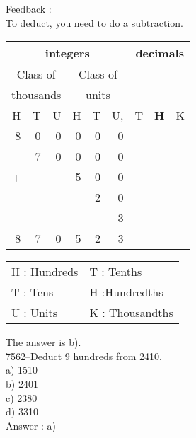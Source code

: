 \documentclass[letterpaper, 12pt]{article}
\begin{document}
Feedback :\\
To deduct, you need to do a subtraction.
\begin{center}
\begin{tabular}{|rrr|rrr|rrr|}
\hline
\multicolumn{6}{|c|}{integers} &\multicolumn{3}{|c|}{decimals} \\
\hline
\multicolumn{3}{|c|}{Class of} &\multicolumn{3}{|c|}{Class of} &  \multicolumn{3}{c|}{} \\
\multicolumn{3}{|c|}{thousands} &\multicolumn{3}{|c|}{units} &  \multicolumn{3}{c|}{} \\
\hline
H & T & U &H & T & U, & T\up{th} & \textbf{H\up{th}} & K\up{th} \\
\hline
\hline
8 & 0 & 0 & 0 & 0 & 0 &  & &\\
 & 7 & 0 & 0 & 0 & 0 &  & &\\
+ &  &  & 5 & 0 & 0 &  & &\\
 &  &  &  & 2 & 0 &  & &\\
 &  &  &  &  & 3 &  & &\\
\hline
\hline
 8 & 7 & 0 & 5 & 2 & 3 &  & &
\\
\hline
\end{tabular}
\end{center}

\scriptsize
\begin{center}
\begin{tabular}{ll}
H : Hundreds & T\up{th} : Tenths\\
T : Tens & H\up{th} :Hundredths\\
U : Units & K\up{e} : Thousandths\\
\end{tabular}
\end{center}

\normalsize
The answer is b).\\





7562--Deduct 9 hundreds from 2410.\\

a) 1510\\
b) 2401\\
c) 2380\\
d) 3310\\

Answer : a)\\
\end{document}
